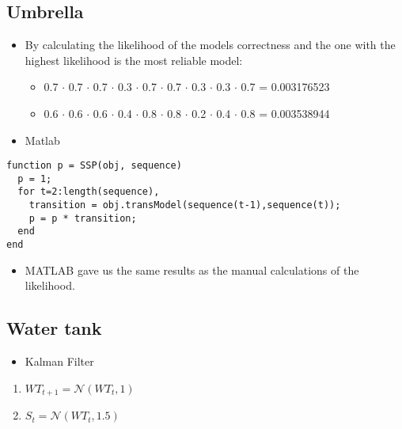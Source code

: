 \documentclass[colorlinks=true,linkcolor=blue]{article}
\begin{document}
\subsection{Umbrella}
\label{sec-3-1}
\begin{itemize}
\item By calculating the likelihood of the models correctness and the one with the highest likelihood is the most reliable model:
\begin{itemize}
\item 0.7 $\cdot$ 0.7 $\cdot$ 0.7 $\cdot$ 0.3 $\cdot$ 0.7 $\cdot$ 0.7 $\cdot$ 0.3 $\cdot$ 0.3 $\cdot$ 0.7 = 0.003176523
\item 0.6 $\cdot$ 0.6 $\cdot$ 0.6 $\cdot$ 0.4 $\cdot$ 0.8 $\cdot$ 0.8 $\cdot$ 0.2 $\cdot$ 0.4 $\cdot$ 0.8 = 0.003538944
\end{itemize}
\item Matlab
\end{itemize}
\begin{verbatim}
function p = SSP(obj, sequence)
  p = 1;
  for t=2:length(sequence),
    transition = obj.transModel(sequence(t-1),sequence(t));
    p = p * transition;                
  end
end
\end{verbatim}
\begin{itemize}
\item MATLAB gave us the same results as the manual calculations of the likelihood.
\end{itemize}


\subsection{Water tank}
\label{sec-3-2}
\begin{itemize}
\item Kalman Filter
\end{itemize}
\begin{enumerate}
\item $WT_{t+1} = \mathcal{N}(WT_t,1)$
\item $S_t = \mathcal{N}(WT_t,1.5)$
\end{enumerate}
\end{document}
